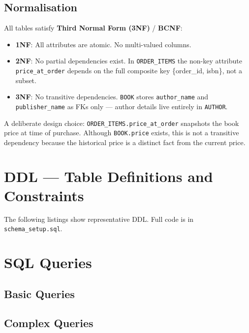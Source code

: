 \documentclass[12pt, a4paper]{article}
\begin{document}
\subsection{Normalisation}

All tables satisfy \textbf{Third Normal Form (3NF)} / \textbf{BCNF}:

\begin{itemize}
    \item \textbf{1NF}: All attributes are atomic. No multi-valued columns.
    \item \textbf{2NF}: No partial dependencies exist. In \texttt{ORDER\_ITEMS}
          the non-key attribute \texttt{price\_at\_order} depends on the full
          composite key \{order\_id, isbn\}, not a subset.
    \item \textbf{3NF}: No transitive dependencies. \texttt{BOOK} stores
          \texttt{author\_name} and \texttt{publisher\_name} as FKs only —
          author details live entirely in \texttt{AUTHOR}.
\end{itemize}

A deliberate design choice: \texttt{ORDER\_ITEMS.price\_at\_order} snapshots the
book price at time of purchase. Although \texttt{BOOK.price} exists, this is not a
transitive dependency because the historical price is a distinct fact from the
current price.

\section{DDL — Table Definitions and Constraints}

The following listings show representative DDL. Full code is in
\texttt{schema\_setup.sql}.



\section{SQL Queries}

\subsection{Basic Queries}







\subsection{Complex Queries}
\end{document}
